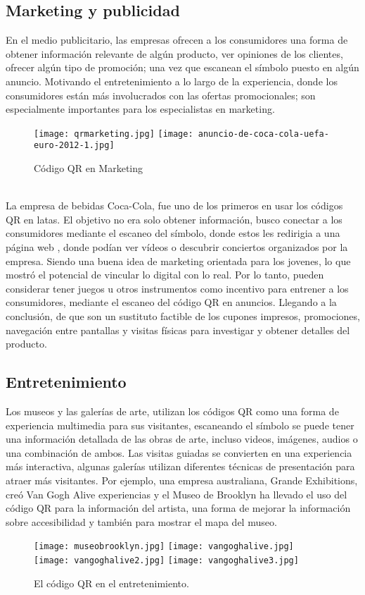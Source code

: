 \subsection{Marketing y publicidad}
En el medio publicitario, las empresas ofrecen a los consumidores una forma de obtener información relevante de algún producto, ver opiniones de los clientes, ofrecer algún tipo de promoción; una vez que escanean el símbolo puesto en algún anuncio. Motivando el entretenimiento a lo largo de la experiencia, donde los consumidores están más involucrados con las ofertas promocionales; son especialmente importantes para los especialistas en marketing. \cite{2014_Ertekin}
\begin{figure} 
	\centering
	\texttt{[image: qrmarketing.jpg]}
	\texttt{[image: anuncio-de-coca-cola-uefa-euro-2012-1.jpg]}
	\caption{Código QR en Marketing}
	\label{fig:qrmarketing}
\end{figure}
\\
La empresa de bebidas Coca-Cola, fue uno de los primeros en usar los códigos QR en latas. El objetivo no era solo obtener información, busco conectar a los consumidores mediante el escaneo del símbolo, donde estos les redirigia a una página web , donde podían ver vídeos o descubrir conciertos organizados por la empresa. Siendo una buena idea de marketing orientada para los jovenes, lo que mostró el potencial de vincular lo digital con lo real.\cite{Generator2021}
Por lo tanto, pueden considerar tener juegos u otros instrumentos como incentivo para entrener a los consumidores, mediante el escaneo del código QR en anuncios. Llegando a la conclusión, de que son un sustituto factible de los cupones impresos, promociones, navegación entre pantallas y visitas físicas para investigar y obtener detalles del producto. \cite{2014_Ertekin}

\subsection{Entretenimiento}
Los museos y las galerías de arte, utilizan los códigos QR como una forma de experiencia multimedia para sus visitantes, escaneando el símbolo se puede tener una información detallada de las obras de arte, incluso videos, imágenes, audios o una combinación de ambos. Las visitas guiadas se convierten en una experiencia más interactiva, algunas galerías utilizan diferentes técnicas de presentación para atraer más visitantes. Por ejemplo, una empresa australiana, Grande Exhibitions, creó Van Gogh Alive experiencias  y el Museo de Brooklyn ha llevado el uso del código QR para la información del artista, una forma de mejorar la información sobre accesibilidad y también para mostrar el mapa del museo.\cite{2012_Emek}
\begin{figure}
	\centering 
	\texttt{[image: museobrooklyn.jpg]}
	\texttt{[image: vangoghalive.jpg]}
	\texttt{[image: vangoghalive2.jpg]}
	\texttt{[image: vangoghalive3.jpg]}
	\caption{El código QR en el entretenimiento.}
	\label{fig:qrentretenimiento}
\end{figure}

